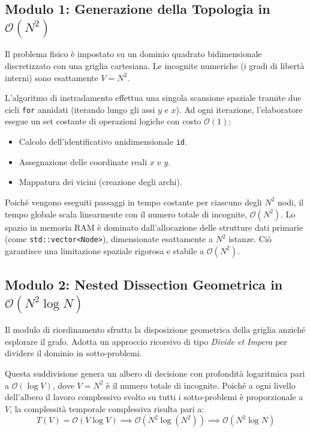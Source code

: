 \documentclass[a4paper,12pt]{article}
\begin{document}
\subsection{Modulo 1: Generazione della Topologia in $\mathcal{O}(N^2)$}
Il problema fisico è impostato su un dominio quadrato bidimensionale discretizzato con una griglia cartesiana. Le incognite numeriche (i gradi di libertà interni) sono esattamente $V = N^2$. 

L'algoritmo di instradamento effettua una singola scansione spaziale tramite due cicli \texttt{for} annidati (iterando lungo gli assi $y$ e $x$). Ad ogni iterazione, l'elaboratore esegue un set costante di operazioni logiche con costo $\mathcal{O}(1)$:
\begin{itemize}
    \item Calcolo dell'identificativo unidimensionale \texttt{id}.
    \item Assegnazione delle coordinate reali $x$ e $y$.
    \item Mappatura dei vicini (creazione degli archi).
\end{itemize}
Poiché vengono eseguiti passaggi in tempo costante per ciascuno degli $N^2$ nodi, il tempo globale scala linearmente con il numero totale di incognite, $\mathcal{O}(N^2)$.
Lo spazio in memoria RAM è dominato dall'allocazione delle strutture dati primarie (come \texttt{std::vector<Node>}), dimensionate esattamente a $N^2$ istanze. Ciò garantisce una limitazione spaziale rigorosa e stabile a $\mathcal{O}(N^2)$.

\vspace{0.5cm}

\subsection{Modulo 2: Nested Dissection Geometrica in $\mathcal{O}(N^2 \log N)$}
Il modulo di riordinamento sfrutta la disposizione geometrica della griglia anziché esplorare il grafo. Adotta un approccio ricorsivo di tipo \textit{Divide et Impera} per dividere il dominio in sotto-problemi.

Questa suddivisione genera un albero di decisione con profondità logaritmica pari a $\mathcal{O}(\log V)$, dove $V = N^2$ è il numero totale di incognite. Poiché a ogni livello dell'albero il lavoro complessivo svolto su tutti i sotto-problemi è proporzionale a $V$, la complessità temporale complessiva risulta pari a:
\begin{equation}
    T(V) = \mathcal{O}(V \log V) \implies \mathcal{O}(N^2 \log(N^2)) \implies \mathcal{O}(N^2 \log N)
\end{equation}
\end{document}
